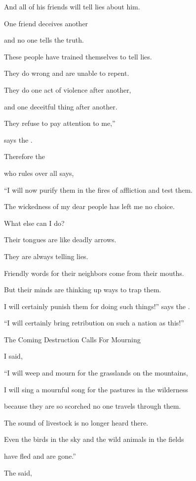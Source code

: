 {\par }{\Q And all
of his friends
will tell lies about him.
\par }{\Q {}One
friend
deceives
another
\par }{\Q and no
one tells
the truth.
\par }{\Q These people have
trained
themselves to tell
lies.
\par }{\Q They do wrong
and are unable
to repent.
\par }{\Q {}They do one act of violence
after another,
\par }{\Q and one deceitful
thing after another.

\par }{\Q They refuse
to pay attention
to me,”

\par }{\Q says
the {}.
\par }{\PP {}Therefore
the

{}
who rules over all
says,
\par }{\Q “I will now purify them in the fires of affliction
and test
them.
\par }{\Q The wickedness of my dear
people
has left me no choice.
\par }{\Q What
else can I do?
\par }{\Q {}Their tongues
are like deadly
arrows.
\par }{\Q They are always telling
lies.
\par }{\Q Friendly
words
for
their neighbors
come from their mouths.
\par }{\Q But their minds are thinking up ways to trap them.
\par }{\Q {}I will certainly
punish
them for doing such things!” says
the {}.
\par }{\Q “I will certainly bring retribution
on such a nation
as
this!”
\par }{\SH The Coming Destruction Calls For Mourning
\par }{\PP {}I said,

\par }{\Q “I will weep
and mourn
for the grasslands on
the mountains,
\par }{\Q I will sing
a mournful song
for the pastures
in the wilderness
\par }{\Q because
they are so scorched
no one travels through
them.
\par }{\Q The sound
of livestock
is no longer
heard
there.
\par }{\Q Even the birds
in the sky
and the wild animals
in the fields
\par }{\Q have fled
and are gone.”
\par }{\PP {}The
{} said,

}
